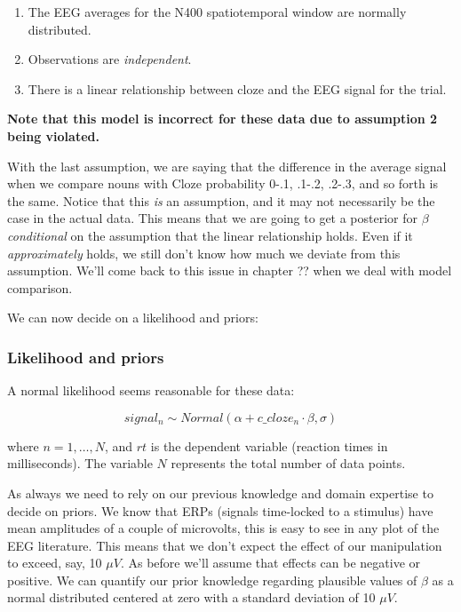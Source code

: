 \documentclass[12pt,]{krantz}
\providecommand{\tightlist}{%
  \setlength{\itemsep}{0pt}\setlength{\parskip}{0pt}}
\theoremstyle{definition}
\theoremstyle{definition}
\theoremstyle{definition}
\theoremstyle{remark}
\begin{document}
\begin{enumerate}
\def\labelenumi{\arabic{enumi}.}
\tightlist
\item
  The EEG averages for the N400 spatiotemporal window are normally distributed.
\item
  Observations are \emph{independent}.
\item
  There is a linear relationship between cloze and the EEG signal for the trial.
\end{enumerate}

\textbf{Note that this model is incorrect for these data due to assumption 2 being violated.}

With the last assumption, we are saying that the difference in the average signal when we compare nouns with Cloze probability 0-.1, .1-.2, .2-.3, and so forth is the same. Notice that this \emph{is} an assumption, and it may not necessarily be the case in the actual data. This means that we are going to get a posterior for \(\beta\) \emph{conditional} on the assumption that the linear relationship holds. Even if it \emph{approximately} holds, we still don't know how much we deviate from this assumption. We'll come back to this issue in chapter ?? when we deal with model comparison.

We can now decide on a likelihood and priors:

\hypertarget{likelihood-and-priors-1}{%
\subsubsection{Likelihood and priors}\label{likelihood-and-priors-1}}

A normal likelihood seems reasonable for these data:

\begin{equation}
   signal_n \sim Normal( \alpha + c\_cloze_n \cdot \beta,\sigma)
  \label{eq:Mcp}
 \end{equation}

where \(n =1, \ldots, N\), and \(rt\) is the dependent variable (reaction times in milliseconds). The variable \(N\) represents the total number of data points.

As always we need to rely on our previous knowledge and domain expertise to decide on priors. We know that ERPs (signals time-locked to a stimulus) have mean amplitudes of a couple of microvolts, this is easy to see in any plot of the EEG literature. This means that we don't expect the effect of our manipulation to exceed, say, 10 \(\mu V\). As before we'll assume that effects can be negative or positive. We can quantify our prior knowledge regarding plausible values of \(\beta\) as a normal distributed centered at zero with a standard deviation of 10 \(\mu V\).
\end{document}
